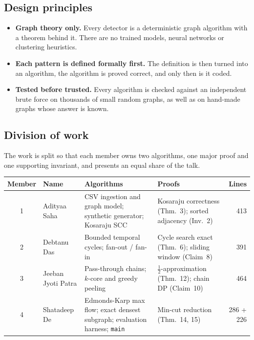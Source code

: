 \documentclass[11pt,a4paper]{article}
\theoremstyle{definition}
\begin{document}
\subsection{Design principles}
\begin{itemize}[leftmargin=1.5em]
\item \textbf{Graph theory only.} Every detector is a deterministic graph algorithm with a theorem behind it. There are no trained models, neural networks or clustering heuristics.
\item \textbf{Each pattern is defined formally first.} The definition is then turned into an algorithm, the algorithm is proved correct, and only then is it coded.
\item \textbf{Tested before trusted.} Every algorithm is checked against an independent brute force on thousands of small random graphs, as well as on hand-made graphs whose answer is known.
\end{itemize}

\subsection{Division of work}
The work is split so that each member owns two algorithms, one major proof and one supporting invariant, and presents an equal share of the talk.

\medskip
\noindent
{\small
\setlength{\tabcolsep}{4.5pt}
\begin{tabular}{@{}cl>{\raggedright\arraybackslash}p{4.9cm}>{\raggedright\arraybackslash}p{4.9cm}r@{}}
\toprule
\textbf{Member} & \textbf{Name} & \textbf{Algorithms} & \textbf{Proofs} & \textbf{Lines} \\
\midrule
1 & Adityaa Saha & CSV ingestion and graph model; synthetic generator; Kosaraju SCC & Kosaraju correctness (Thm.~3); sorted adjacency (Inv.~2) & 413 \\
2 & Debtanu Das & Bounded temporal cycles; fan-out / fan-in & Cycle search exact (Thm.~6); sliding window (Claim~8) & 391 \\
3 & Jeeban Jyoti Patra & Pass-through chains; $k$-core and greedy peeling & $\frac{1}{2}$-approximation (Thm.~12); chain DP (Claim~10) & 464 \\
4 & Shatadeep De & Edmonds-Karp max flow; exact densest subgraph; evaluation harness; \texttt{main} & Min-cut reduction (Thm.~14, 15) & 286 + 226 \\
\bottomrule
\end{tabular}
}

\end{document}
